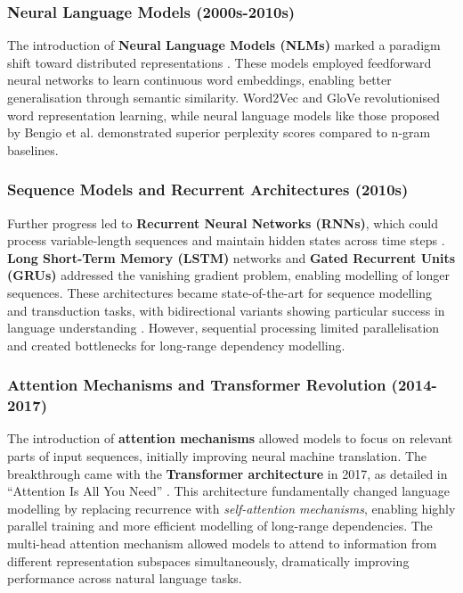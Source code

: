 \subsubsection{Neural Language Models (2000s-2010s)}
The introduction of \textbf{Neural Language Models (NLMs)} marked a paradigm shift toward distributed representations \citep{bengio2003neural}. These models employed feedforward neural networks to learn continuous word embeddings, enabling better generalisation through semantic similarity. Word2Vec \citep{mikolov2013word2vec} and GloVe \citep{pennington2014glove} revolutionised word representation learning, while neural language models like those proposed by Bengio et al. demonstrated superior perplexity scores compared to n-gram baselines.

\subsubsection{Sequence Models and Recurrent Architectures (2010s)}
Further progress led to \textbf{Recurrent Neural Networks (RNNs)}, which could pro\-cess variable-length sequences and maintain hidden states across time steps \citep{elman1990finding}. \textbf{Long Short-Term Memory (LSTM)} networks \citep{hochreiter1997lstm} and \textbf{Gated Recurrent Units (GRUs)} \citep{cho2014gru} addressed the vanishing gradient problem, enabling modelling of longer sequences. These architectures became state-of-the-art for sequence modelling and transduction tasks, with bidirectional variants showing particular success in language understanding \citep{graves2005bidirectional}. However, sequential processing limited parallelisation and created bottlenecks for long-range dependency modelling.

\subsubsection{Attention Mechanisms and Transformer Revolution (2014-2017)}
The introduction of \textbf{attention mechanisms} \citep{bahdanau2014attention} allowed models to focus on relevant parts of input sequences, initially improving neural machine translation. The breakthrough came with the \textbf{Transformer architecture} in 2017, as detailed in ``Attention Is All You Need'' \citep{vaswani2017attention}. This architecture fundamentally changed language modelling by replacing recurrence with \textit{self-attention mechanisms}, enabling highly parallel training and more efficient modelling of long-range dependencies. The multi-head attention mechanism allowed models to attend to information from different representation subspaces simultaneously, dramatically improving performance across natural language tasks.

